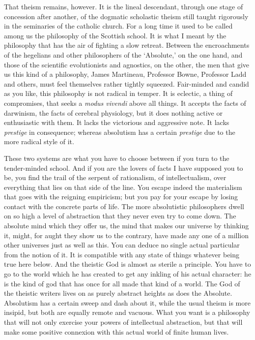 \documentclass[]{article}
\begin{document}
That theism remains, however. It is the lineal descendant, through one
stage of concession after another, of the dogmatic scholastic theism
still taught rigorously in the seminaries of the catholic church. For a
long time it used to be called among us the philosophy of the Scottish
school. It is what I meant by the philosophy that has the air of
fighting a slow retreat. Between the encroachments of the hegelians and
other philosophers of the `Absolute,' on the one hand, and those of the
scientific evolutionists and agnostics, on the other, the men that
give us this kind of a philosophy, James Martineau, Professor Bowne,
Professor Ladd and others, must feel themselves rather tightly squeezed.
Fair-minded and candid as you like, this philosophy is not radical
in temper. It is eclectic, a thing of compromises, that seeks a \emph{modus
vivendi} above all things. It accepts the facts of darwinism, the facts
of cerebral physiology, but it does nothing active or enthusiastic with
them. It lacks the victorious and aggressive note. It lacks \emph{prestige} in
consequence; whereas absolutism has a certain \emph{prestige} due to the more
radical style of it.

These two systems are what you have to choose between if you turn to the
tender-minded school. And if you are the lovers of facts I have
supposed you to be, you find the trail of the serpent of rationalism, of
intellectualism, over everything that lies on that side of the line. You
escape indeed the materialism that goes with the reigning empiricism;
but you pay for your escape by losing contact with the concrete parts
of life. The more absolutistic philosophers dwell on so high a level
of abstraction that they never even try to come down. The absolute mind
which they offer us, the mind that makes our universe by thinking it,
might, for aught they show us to the contrary, have made any one of a
million other universes just as well as this. You can deduce no single
actual particular from the notion of it. It is compatible with any state
of things whatever being true here below. And the theistic God is almost
as sterile a principle. You have to go to the world which he has created
to get any inkling of his actual character: he is the kind of god that
has once for all made that kind of a world. The God of the theistic
writers lives on as purely abstract heights as does the Absolute.
Absolutism has a certain sweep and dash about it, while the usual theism
is more insipid, but both are equally remote and vacuous. What you want
is a philosophy that will not only exercise your powers of intellectual
abstraction, but that will make some positive connexion with this actual
world of finite human lives.
\end{document}
